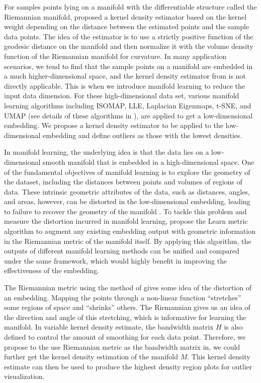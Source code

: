 \documentclass[11pt,a4paper,]{article}
\begin{document}
For samples points lying on a manifold with the differentiable structure called the Riemannian manifold, \textcite{Pelletier2005-vu} proposed a kernel density estimator based on the kernel weight depending on the distance between the estimated points and the sample data points. The idea of the estimator is to use a strictly positive function of the geodesic distance on the manifold and then normalize it with the volume density function of the Riemannian manifold for curvature. \autocite{Henry2009-ll} In many application scenarios, we tend to find that the sample points on a manifold are embedded in a much higher-dimensional space, and the kernel density estimator from \textcite{Pelletier2005-vu} is not directly applicable.
This is when we introduce manifold learning to reduce the input data dimension. For these high-dimensional data set, various manifold learning algorithms including ISOMAP, LLE, Laplacian Eigenmaps, t-SNE, and UMAP (see details of these algorithms in \textcite{Cheng2021-ex}), are applied to get a low-dimensional embedding. We propose a kernel density estimator to be applied to the low-dimensional embedding and define outliers as those with the lowest densities.

In manifold learning, the underlying idea is that the data lies on a low-dimensional smooth manifold that is embedded in a high-dimensional space. One of the fundamental objectives of manifold learning is to explore the geometry of the dataset, including the distances between points and volumes of regions of data. These intrinsic geometric attributes of the data, such as distances, angles, and areas, however, can be distorted in the low-dimensional embedding, leading to failure to recover the geometry of the manifold \autocite{Goldberg2008-co}. To tackle this problem and measure the distortion incurred in manifold learning,
\textcite{Perrault-Joncas2013-pq} propose the Learn metric algorithm to augment any existing embedding output with geometric information in the Riemannian metric of the manifold itself. By applying this algorithm, the outputs of different manifold learning methods can be unified and compared under the same framework, which would highly benefit in improving the effectiveness of the embedding.

The Riemannian metric using the method of \textcite{Perrault-Joncas2013-pq} gives some idea of the distortion of an embedding. Mapping the points through a non-linear function ``stretches'' some regions of space and ``shrinks'' others. The Riemannian gives us an idea of the direction and angle of this stretching, which is informative for learning the manifold. In variable kernel density estimate, the bandwidth matrix \(H\) is also defined to control the amount of smoothing for each data point.
Therefore, we propose to the use Riemannian metric as the bandwidth matrix in, we could further get the kernel density estimation of the manifold \(M\). This kernel density estimate can then be used to produce the highest density region plots\autocite{Hyndman1996-lk} for outlier visualization.
\end{document}
